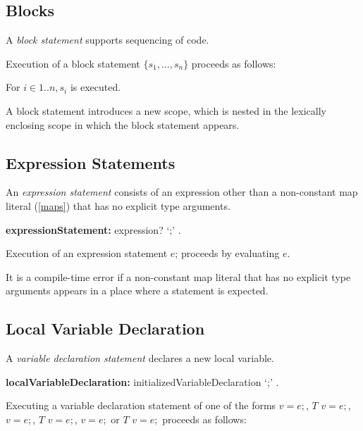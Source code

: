 \documentclass{article}
\newcommand{\code}[1]{{\sf #1}}
\begin{document}
 \subsection{Blocks}

\LMHash{}
A {\em block statement} supports sequencing of code.

\LMHash{}
Execution of a block statement $\{s_1, \ldots,  s_n\}$ proceeds as follows:

\LMHash{}
For $i \in 1 .. n, s_i$ is executed.

\LMHash{}
A block statement introduces a new scope, which is nested in the lexically enclosing scope in which the block statement appears.


\subsection{Expression Statements}

\LMHash{}
An {\em expression statement} consists of an expression other than a non-constant map literal (\ref{maps}) that has no explicit type arguments.


 \begin{grammar}
{\bf expressionStatement:}
  expression? `{\escapegrammar ;}'
  .
 \end{grammar}

\LMHash{}
Execution of an expression statement \code{$e$;} proceeds by evaluating $e$.

\LMHash{}
It is a compile-time error if a non-constant map literal that has no explicit type arguments appears in a place where a statement is expected.

\subsection{Local Variable Declaration}


\LMHash{}
A {\em variable declaration statement }declares a new local variable.

 \begin{grammar}
{\bf localVariableDeclaration:}
    initializedVariableDeclaration `{\escapegrammar ;}'
  .
 \end{grammar}

\LMHash{}
 Executing a variable declaration statement of one of the forms  \VAR{} $v = e;$, $T$ $v = e; $, \CONST{}  $v = e;$, \CONST{} $T$ $v = e;$, \FINAL{}  $v = e;$ or \FINAL{} $T$ $v = e;$ proceeds as follows:
\end{document}
